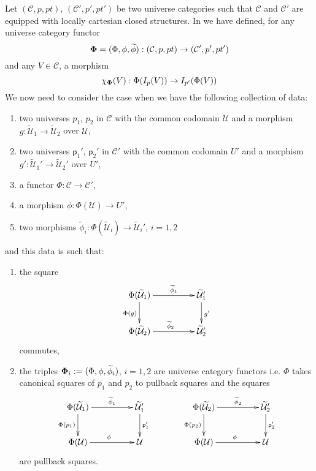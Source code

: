 \documentclass[12pt]{article}
\numberwithin{equation}{section}
\newcommand{\sr}{\rightarrow}
\newcommand{\wt}{\widetilde}
\newcommand{\spc}{{\,\,\,\,\,\,\,}}
\newcommand{\p}{\mathsf{p}}
\newcommand{\U}{\mathcal{U}}
\begin{document}
Let $({\mathcal C},p,pt)$, $({\mathcal C}',p',pt')$ be two universe categories
such that $\mathcal C$ and $\mathcal C'$ are equipped with locally cartesian
closed structures. In \cite[Construction 5.6]{fromunivwithPi} we have defined,
for any universe category functor
%
$${\bf\Phi}=(\Phi,\phi,\wt{\phi}):({\mathcal C},p,pt)\sr ({\mathcal
  C}',p',pt')$$
%
and any $V\in {\mathcal C}$, a morphism
%
$$\chi_{\bf\Phi}(V):\Phi(I_p(V))\sr I_{p'}(\Phi(V))$$
%
We now need to consider the case when we have the following collection of data:
%
\begin{enumerate}
\item two universes $p_1$, $p_2$ in $\mathcal C$ with the common codomain $\U$
  and a morphism $g:\wt{\U}_1\sr \wt{\U}_2$ over $\U$,
\item two universes $\p_1'$, $\p_2'$ in $\mathcal C'$ with the common codomain
  $U'$ and a morphism $g':\wt{\U}_1'\sr \wt{\U}_2'$ over $U'$,
\item a functor $\Phi:{\mathcal C}\sr {\mathcal C}'$,
\item a morphism $\phi:\Phi(\U)\sr U'$,
\item two morphisms $\wt{\phi}_i:\Phi(\wt{\U}_i)\sr \wt{\U}_i'$, $i=1,2$
\end{enumerate}
%
and this data is such that:
%
\begin{enumerate}
\item the square
%
$$
\begin{xy}
          \xymatrix@C=4pc{ \Phi(\wt{\U}_1) \ar[r]^-{\wt{\phi}_1}
            \ar[d]_{\Phi(g)} & \wt{\U}_1' \ar[d]^{g'}\\ \Phi(\wt{\U}_2)
            \ar[r]^{\wt{\phi}_2} & \wt{\U}_2' }
\end{xy}
$$
%
commutes,
%
\item the triples ${\bf\Phi}_i:=(\Phi,\phi,\wt{\phi}_i)$, $i=1,2$ are universe
  category functors i.e.  $\Phi$ takes canonical squares of $p_1$ and $p_2$ to
  pullback squares and the squares
%
$$
\begin{xy}
          \xymatrix@C=4pc{ \Phi(\wt{\U}_1) \ar[r]^-{\wt{\phi}_1}
            \ar[d]_{\Phi(p_1)} & \wt{\U}_1' \ar[d]^{\p_1'}\\ \Phi(\U)
            \ar[r]^{\phi} & \U }
\end{xy}
\spc\spc\spc
\begin{xy}
          \xymatrix@C=4pc{ \Phi(\wt{\U}_2) \ar[r]^-{\wt{\phi}_2}
            \ar[d]_{\Phi(p_2)} & \wt{\U}_2' \ar[d]^{\p_2'}\\ \Phi(\U)
            \ar[r]^{\phi} & \U }
\end{xy}
$$
%
are pullback squares.
\end{enumerate}
\end{document}
